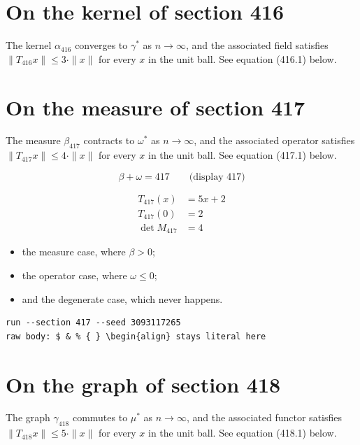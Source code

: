 \documentclass{article}
\begin{document}
\section{On the kernel of section 416}
The kernel $\alpha_{416}$ converges to $\gamma^{*}$ as $n \to \infty$,
and the associated field satisfies $\|T_{416} x\| \leq 3 \cdot \|x\|$
for every $x$ in the unit ball. See equation (416.1) below.

\section{On the measure of section 417}
The measure $\beta_{417}$ contracts to $\omega^{*}$ as $n \to \infty$,
and the associated operator satisfies $\|T_{417} x\| \leq 4 \cdot \|x\|$
for every $x$ in the unit ball. See equation (417.1) below.

$$
\beta + \omega = 417 \qquad \text{(display 417)}
$$

\begin{align}
T_{417}(x) &= 5 x + 2 \\
T_{417}(0) &= 2 \\
\det M_{417} &= 4
\end{align}

\begin{itemize}
  \item the measure case, where $\beta > 0$;
  \item the operator case, where $\omega \leq 0$;
  \item and the degenerate case, which never happens.
\end{itemize}

\begin{verbatim}
run --section 417 --seed 3093117265
raw body: $ & % { } \begin{align} stays literal here
\end{verbatim}

\section{On the graph of section 418}
The graph $\gamma_{418}$ commutes to $\mu^{*}$ as $n \to \infty$,
and the associated functor satisfies $\|T_{418} x\| \leq 5 \cdot \|x\|$
for every $x$ in the unit ball. See equation (418.1) below.
\end{document}
